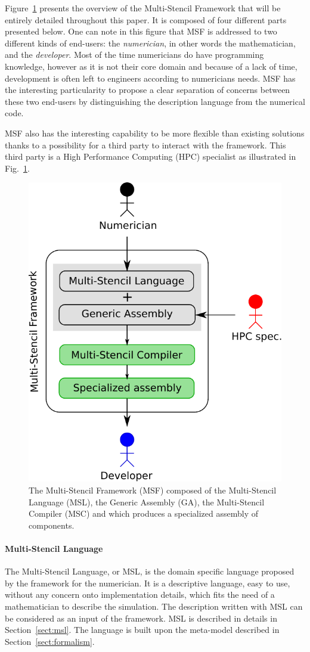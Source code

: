 Figure~\ref{fig:msf} presents the overview of the Multi-Stencil Framework that will be entirely detailed throughout this paper. It is composed of four different parts presented below.
One can note in this figure that MSF is addressed to two different kinds of end-users: the \emph{numerician}, in other words the mathematician, and the \emph{developer}. Most of the time numericians do have programming knowledge, however as it is not their core domain and because of a lack of time, development is often left to engineers according to numericians needs. MSF has the interesting particularity to propose a clear separation of concerns between these two end-users by distinguishing the description language from the numerical code. 

MSF also has the interesting capability to be more flexible than existing solutions thanks to a possibility for a third party to interact with the framework. This third party is a High Performance Computing (HPC) specialist as illustrated in Fig.~\ref{fig:msf}.

\begin{figure}[t]
\begin{center}
  \includegraphics[width=.4\textwidth]{./images/msf.pdf}
  \caption{The Multi-Stencil Framework (MSF) composed of the Multi-Stencil Language (MSL), the Generic Assembly (GA), the Multi-Stencil Compiler (MSC) and which produces a specialized assembly of components.}
  \label{fig:msf}
\end{center}
\end{figure}

\paragraph{\textbf{Multi-Stencil Language}}
The Multi-Stencil Language, or MSL, is the domain specific language proposed by the framework for the numerician. It is a descriptive language, easy to use, without any concern onto implementation details, which fits the need of a mathematician to describe the simulation. The description written with MSL can be considered as an input of the framework. MSL is described in details in Section~\ref{sect:msl}. The language is built upon the meta-model described in Section~\ref{sect:formalism}.

